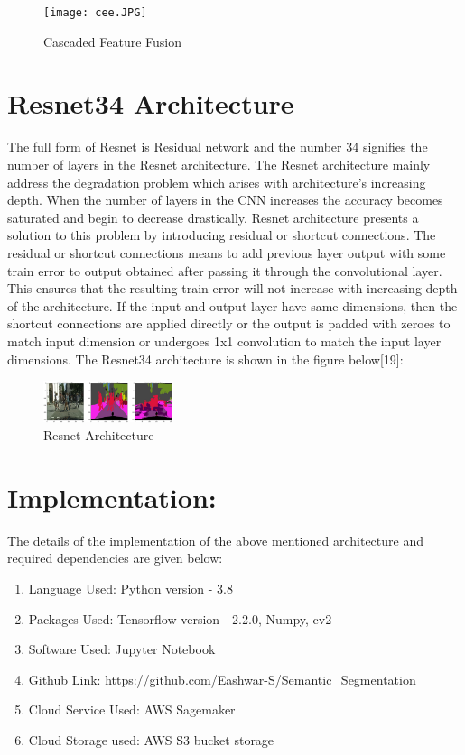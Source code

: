 \documentclass{IEEEtran}
\begin{document}
\begin{figure}[h]
    \centering
    \captionsetup{justification=centering}
    \texttt{[image: cee.JPG]}
    \caption{Cascaded Feature Fusion}
    \label{fig:Binary class segmented output}
\end{figure}

\section{\textbf{Resnet34 Architecture}}
The full form of Resnet is Residual network and the number 34 signifies the number of layers in the Resnet architecture. The Resnet architecture mainly address the degradation problem which arises with architecture's increasing depth. When the number of layers in the CNN increases the accuracy becomes saturated and begin to decrease drastically. Resnet architecture presents a solution to this problem by introducing residual or shortcut connections. The residual or shortcut connections means to add previous layer output with some train error to output obtained after passing it through the convolutional layer. This ensures that the resulting train error will not increase with increasing depth of the architecture. If the input and output layer have same dimensions, then the shortcut connections are applied directly or the output is padded with zeroes to match input dimension or undergoes 1x1 convolution to match the input layer dimensions. The Resnet34 architecture is shown in the figure below[19]: 

\newpage
\begin{figure}[h]
    \centering
    \captionsetup{justification=centering}
    \includegraphics[width=3.8cm]{resnet.JPG}
    \caption{Resnet Architecture}
    \label{fig:Binary class segmented output}
\end{figure}

\section{\textbf{Implementation:}}
The details of the implementation of the above mentioned architecture and required dependencies are given below:
\begin{enumerate}
\item Language Used: Python version - 3.8

\item Packages Used: Tensorflow version - 2.2.0, Numpy, cv2

\item Software Used: Jupyter Notebook

\item Github Link: \textcolor{blue}{\underline{\url{https://github.com/Eashwar-S/Semantic_Segmentation}}}

\item Cloud Service Used: AWS Sagemaker

\item Cloud Storage used: AWS S3 bucket storage

\end{enumerate}
\end{document}
